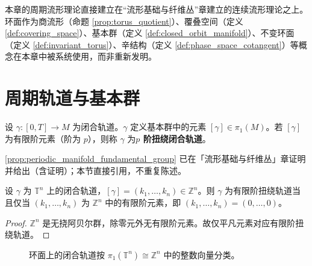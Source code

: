 \begin{remark}\label{rem:periodic_manifold_relation}
本章的周期流形理论直接建立在“流形基础与纤维丛”章建立的连续流形理论之上。环面作为商流形（命题 \ref{prop:torus_quotient}）、覆叠空间（定义 \ref{def:covering_space}）、基本群（定义 \ref{def:closed_orbit_manifold}）、不变环面（定义 \ref{def:invariant_torus}）、辛结构（定义 \ref{def:phase_space_cotangent}）等概念在本章中被系统使用，而非重新发明。
\end{remark}

\section{周期轨道与基本群}\label{sec:periodic_orbit_fundamental_group}

\begin{definition}[闭合轨道与扭绕]\label{def:closed_orbit_twisting}
设 $\gamma:[0,T]\to M$ 为闭合轨道。$\gamma$ 定义基本群中的元素 $[\gamma]\in\pi_1(M)$。若 $[\gamma]$ 为有限阶元素（阶为 $p$），则称 $\gamma$ 为\textbf{$p$ 阶扭绕闭合轨道}。
\end{definition}

\begin{remark}[环面基本群的来源]\label{rem:torus_fundamental_group_source}
\cref{prop:periodic_manifold_fundamental_group} 已在「流形基础与纤维丛」章证明并给出（含证明）；本节直接引用，不重复陈述。
\end{remark}

\begin{corollary}[扭绕轨道的判定]\label{cor:twisted_orbit}
设 $\gamma$ 为 $\mathbb{T}^n$ 上的闭合轨道，$[\gamma]=(k_1,\dots,k_n)\in\mathbb{Z}^n$。则 $\gamma$ 为有限阶扭绕轨道当且仅当 $(k_1,\dots,k_n)$ 为 $\mathbb{Z}^n$ 中的有限阶元素，即 $(k_1,\dots,k_n)=(0,\dots,0)$。
\end{corollary}

\begin{proof}
$\mathbb{Z}^n$ 是无挠阿贝尔群，除零元外无有限阶元素。故仅平凡元素对应有限阶扭绕轨道。
\end{proof}

\begin{figure}[htbp]
\centering
{}
\caption{环面上的闭合轨道按 $\pi_1(\mathbb{T}^n)\cong\mathbb{Z}^n$ 中的整数向量分类。}
\label{fig:torus_fundamental_group_periodic}
\end{figure}


